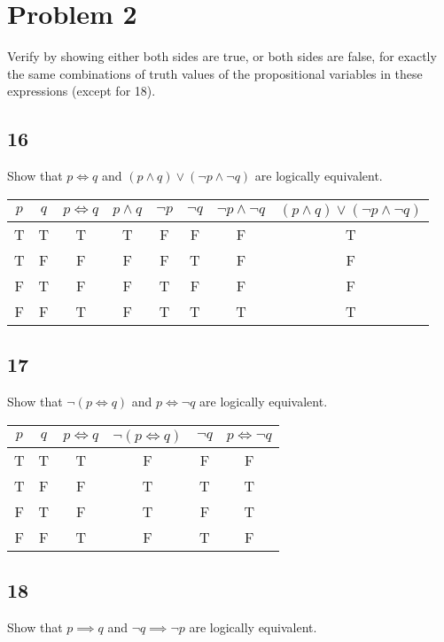 \documentclass{article}
\begin{document}
\section{Problem 2}

Verify by showing either both sides are true, or both sides are false, for exactly the same combinations of truth values of the propositional variables in these expressions (except for 18).

\subsection{16}

Show that $ p \iff q $ and $ ( p \land q ) \lor ( \neg p \land \neg q ) $ are logically equivalent.

\begin{tabular}{ | c | c | c | c | c | c | c | c | }
	$ p $ & $ q $ & $ p \iff q $ & $ p \land q $ & $ \neg p $ & $ \neg q $ & $ \neg p \land \neg q $ & $ ( p \land q ) \lor ( \neg p \land \neg q ) $ \\
	\hline
	T & T & T & T & F & F & F & T \\
	T & F & F & F & F & T & F & F \\
	F & T & F & F & T & F & F & F \\
	F & F & T & F & T & T & T & T
\end{tabular}

\subsection{17}

Show that $ \neg ( p \iff q ) $ and $ p \iff \neg q $ are logically equivalent.

\begin{tabular}{ | c | c | c | c | c | c | }
	$ p $ & $ q $ & $ p \iff q $ & $ \neg ( p \iff q ) $ & $ \neg q $ & $ p \iff \neg q $ \\
	\hline
	T & T & T & F & F & F \\
	T & F & F & T & T & T \\
	F & T & F & T & F & T \\
	F & F & T & F & T & F
\end{tabular}

\subsection{18}

Show that $ p \implies q $ and $ \neg q \implies \neg p $ are logically equivalent.
\end{document}
